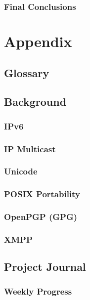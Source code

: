 \documentclass[a4paper,12pt]{report}
\begin{document}
\section{Final Conclusions}


\part{Appendix}

\appendix


\chapter{Glossary}


\chapter{Background}

\section{IPv6}

\section{IP Multicast}

\section{Unicode}

\section{POSIX Portability}

\section{OpenPGP (GPG)}

\section{XMPP}


\chapter{Project Journal}

\section{Weekly Progress}
\end{document}
